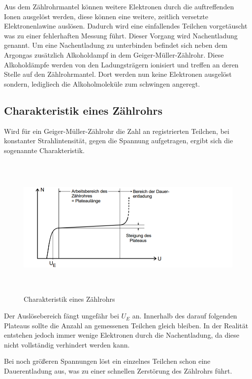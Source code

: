 Aus dem Zählrohrmantel können weitere Elektronen durch die auftreffenden Ionen ausgelöst werden, diese können eine weitere,
zeitlich versetzte Elektronenlawine auslösen. Dadurch wird eine einfallendes Teilchen vorgetäuscht was zu einer
fehlerhaften Messung führt. Dieser Vorgang wird Nachentladung genannt. Um eine Nachentladung zu unterbinden befindet
sich neben dem Argongas zusätzlich Alkoholdampf in dem Geiger-Müller-Zählrohr. Diese Alkoholdämpfe
werden von den Ladungsträgern ionisiert und treffen an deren Stelle auf den Zählrohrmantel. Dort werden nun keine
Elektronen ausgelöst sondern, ledigliech die Alkoholmoleküle zum schwingen angeregt.

\subsection{Charakteristik eines Zählrohrs}

Wird für ein  Geiger-Müller-Zählrohr die Zahl an registrierten Teilchen, bei konstanter Strahlintensität, gegen die Spannung
aufgetragen, ergibt sich die sogenannte Charakteristik.

\begin{figure}[H]
  \centering
  \includegraphics[height=7cm]{charakteristik.PNG}
  \caption{Charakteristik eines Zählrohrs \cite{sample}}
  \label{fig:Linienspektrum}
\end{figure}

Der Auslösebereich fängt ungefähr bei $U_E$ an. Innerhalb des darauf folgenden Plateaus sollte die
Anzahl an gemessenen Teilchen gleich bleiben. In der Realität entstehen jedoch immer wenige Elektronen durch die Nachentladung,
da diese nicht vollständig verhindert werden kann.

Bei noch größeren Spannungen löst ein einzelnes Teilchen schon eine Dauerentladung aus, was zu einer schnellen Zerstörung
des Zählrohrs führt.

